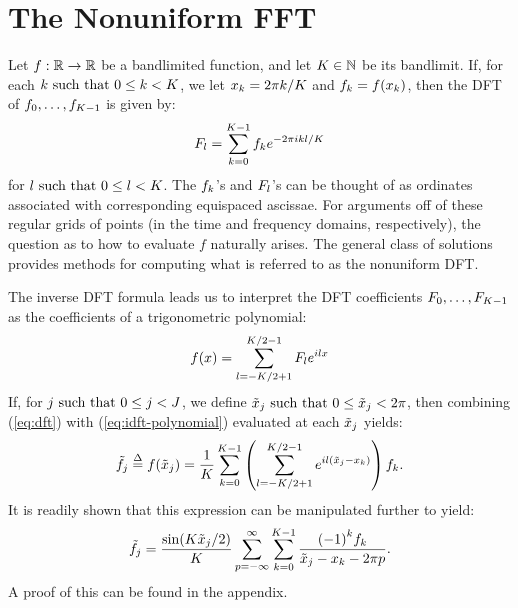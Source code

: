 \section{The Nonuniform FFT}

Let $f: \mathbb{R} \to \mathbb{R}$ be a bandlimited function, and let
$K{} \in \mathbb{N}$ be its bandlimit. If, for each
$k{} \mbox{ such that } 0 \leq k{} < K{}$, we
let ${x}_{k{}} = 2\pi{}k{}/K{}$ and
${f}_{k{}} = f({x}_{k{}})$, then
the DFT of ${f}_{0}, \hdots, {f}_{K{} - 1}$ is given
by:
\begin{align}\label{eq:dft}
  {F}_{l{}} = \sum_{k{}=0}^{K{}-1} {f}_{k{}} e^{-2\pi{}ik{}l{}/K{}}
\end{align}
for $l{} \mbox{ such that } 0 \leq l{} <
K{}$. The ${f}_{k{}}$'s and
${F}_{l{}}$'s can be thought of as ordinates
associated with corresponding equispaced ascissae. For arguments off
of these regular grids of points (in the time and frequency domains,
respectively), the question as to how to evaluate $f$ naturally
arises. The general class of solutions provides methods for computing
what is referred to as the nonuniform DFT.\@

The inverse DFT formula leads us to interpret the DFT coefficients
${F}_{0}, \hdots, {F}_{K{}-1}$ as the coefficients of
a trigonometric polynomial:
\begin{align}\label{eq:idft-polynomial}
  f(x) = \sum_{l{}=-K{}/2+1}^{K{}/2-1} {F}_{l{}} e^{il{}x}
\end{align}
If, for $j{} \mbox{ such that } 0 \leq j{} < J{}$, we define
${\tilde{x}}_{j{}} \mbox{ such that } 0 \leq {\tilde{x}}_{j{}} < 2\pi$, then combining
(\ref{eq:dft}) with (\ref{eq:idft-polynomial}) evaluated at each
${\tilde{x}}_{j{}}$ yields:
\begin{align}\label{eq:first-interpolation}
  {\tilde{f}}_{j{}} \overset{\Delta}{=} f({\tilde{x}}_{j{}}) = \frac{1}{K{}} \sum_{k{}=0}^{K{}-1} \left(\sum_{l{}=-K{}/2+1}^{K{}/2-1} e^{il{}({\tilde{x}}_{j{}} - {x}_{k{}})}\right) {f}_{k{}}.
\end{align}
It is readily shown that this expression can be manipulated further to
yield:
\begin{align}\label{eq:per-interp-cot-kernel}
  {\tilde{f}}_{j{}} = \frac{\sin(K{}{\tilde{x}}_{j{}}/2)}{K{}} \sum_{p{}=-\infty}^\infty \sum_{k{}=0}^{K{}-1} \frac{{(-1)}^{k{}}{f}_{k{}}}{{\tilde{x}}_{j{}} - {x}_{k{}} - 2\pi{}p{}}.
\end{align}
A proof of this can be found in the appendix.

